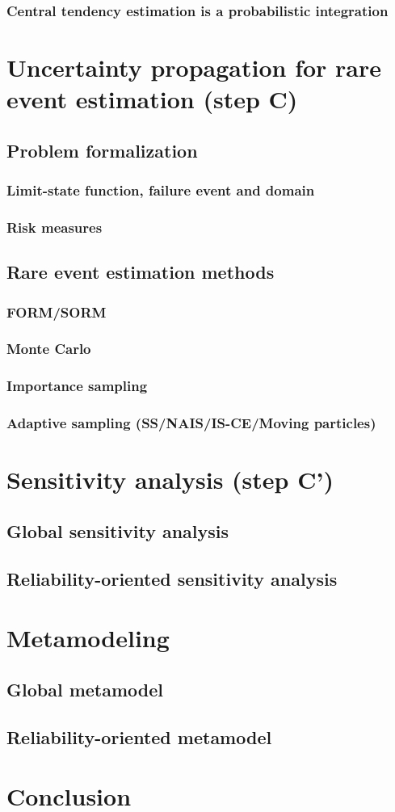             \subsubsection{Central tendency estimation is a probabilistic integration}
    \section{Uncertainty propagation for rare event estimation (step C)}
        \subsection{Problem formalization}
            \subsubsection{Limit-state function, failure event and domain}
            \subsubsection{Risk measures }
        \subsection{Rare event estimation methods}
            \subsubsection{FORM/SORM}
            \subsubsection{Monte Carlo}
            \subsubsection{Importance sampling}
            \subsubsection{Adaptive sampling (SS/NAIS/IS-CE/Moving particles)}
    \section{Sensitivity analysis (step C')}
        \subsection{Global sensitivity analysis}
        \subsection{Reliability-oriented sensitivity analysis}
    \section{Metamodeling}
        \subsection{Global metamodel}
        \subsection{Reliability-oriented metamodel}
    \section{Conclusion}
